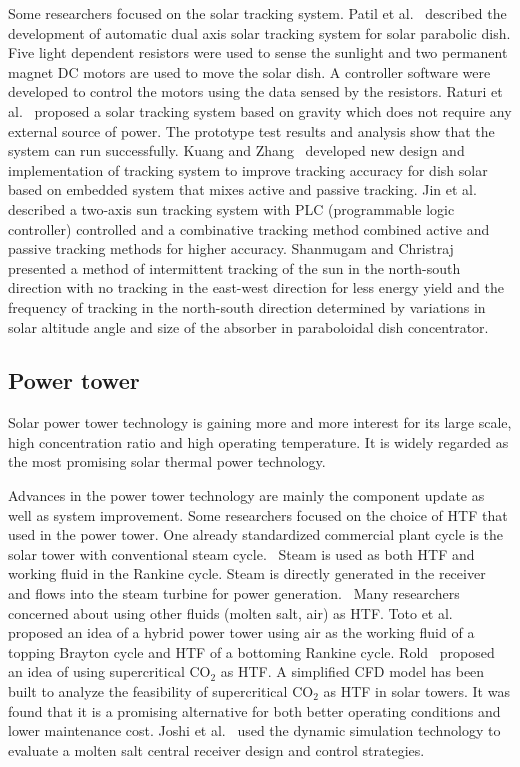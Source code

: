 Some researchers focused on the solar tracking system.
Patil et al.~\cite{Patil2016} described the development of automatic dual axis solar tracking system for solar parabolic dish. Five light dependent resistors were used to sense the sunlight and two permanent magnet DC motors are used to move the solar dish. A controller software were developed to control the motors using the data sensed by the resistors.
Raturi et al.~\cite{Raturi2014} proposed a solar tracking system based on gravity which does not require any external source of power. The prototype test results and analysis show that the system can run successfully.
Kuang and Zhang~\cite{Kuang2012} developed new design and implementation of tracking system to improve tracking accuracy for dish solar based on embedded system that mixes active and passive tracking.
Jin et al.~\cite{Jin2013} described a two-axis sun tracking system with PLC (programmable logic controller) controlled and a combinative tracking method combined active and passive tracking methods for higher accuracy.
Shanmugam and Christraj~\cite{Shanmugam2005} presented a method of intermittent tracking of the sun in the north-south direction with no tracking in the east-west direction for less energy yield and the frequency of tracking in the north-south direction determined by variations in solar altitude angle and size of the absorber in paraboloidal dish concentrator.

\subsection{Power tower}
\label{sec:st}

Solar power tower technology is gaining more and more interest for its large scale, high concentration ratio and high operating temperature.
It is widely regarded as the most promising solar thermal power technology.

Advances in the power tower technology are mainly the component update as well as system improvement.
Some researchers focused on the choice of HTF that used in the power tower. 
One already standardized commercial plant cycle is the solar tower with conventional steam cycle.~\cite{Spiros2017} Steam is 
used as both HTF and working fluid in the Rankine cycle. Steam is directly generated in the receiver and flows into the steam turbine for power generation.~\cite{Montes2009,Feldhoff2012,Steinmann2006,Yu2017,Gonzalez2017} Many researchers concerned about using other fluids (molten salt, air) as HTF.
Toto et al.~\cite{Toro2016} proposed an idea of a hybrid power tower using air as the working fluid of a topping Brayton cycle and HTF of a bottoming Rankine cycle.
Rold~\cite{Rold2016} proposed an idea of using supercritical CO$_2$ as HTF. A simplified CFD model has been built to analyze the feasibility of supercritical CO$_2$ as HTF in solar towers. It was found that it is a promising alternative for both better operating conditions and lower maintenance cost.
Joshi et al.~\cite{Joshi2016} used the dynamic simulation technology to evaluate a molten salt central receiver design and control strategies.

